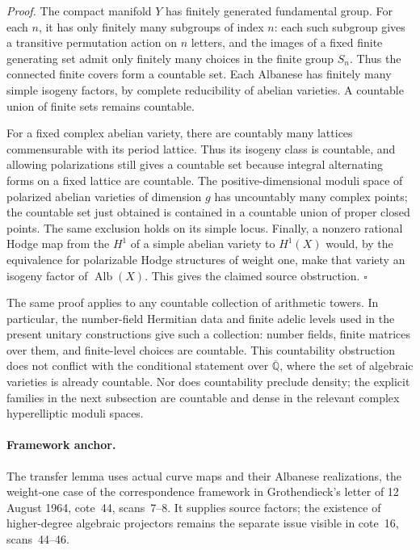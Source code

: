 \documentclass[11pt]{article}
\newcommand{\Q}{\mathbb Q}\newcommand{\C}{\mathbb C}\newcommand{\Z}{\mathbb Z}\newcommand{\R}{\mathbb R}\newcommand{\A}{\mathbb A}\newcommand{\OO}{\mathcal O}
\theoremstyle{definition}\newtheorem{definition}[theorem]{Definition}\newtheorem{remark}[theorem]{Remark}
\begin{document}
\emph{Proof.}
The compact manifold $Y$ has finitely generated fundamental group.  For
each $n$, it has only finitely many subgroups of index $n$: each such
subgroup gives a transitive permutation action on $n$ letters, and the
images of a fixed finite generating set admit only finitely many choices
in the finite group $S_n$.  Thus the connected finite covers form a
countable set.  Each Albanese has finitely many simple isogeny factors,
by complete reducibility of abelian varieties.  A countable union of
finite sets remains countable.

For a fixed complex abelian variety, there are countably many lattices
commensurable with its period lattice.  Thus its isogeny class is
countable, and allowing polarizations still gives a countable set because
integral alternating forms on a fixed lattice are countable.  The
positive-dimensional moduli space of polarized abelian varieties of
dimension $g$ has uncountably many complex points; the countable set just
obtained is contained in a countable union of proper closed points.
The same exclusion holds on its simple locus.  Finally, a nonzero rational
Hodge map from the $H^1$ of a simple abelian variety to $H^1(X)$ would,
by the equivalence for polarizable Hodge structures of weight one, make
that variety an isogeny factor of $\operatorname{Alb}(X)$.  This gives the
claimed source obstruction. \hfill$\square$

The same proof applies to any countable collection of arithmetic towers.
In particular, the number-field Hermitian data and finite adelic levels
used in the present unitary constructions give such a collection: number
fields, finite matrices over them, and finite-level choices are countable.
This countability obstruction does not conflict with the conditional
statement over $\overline{\Q}$, where the set of algebraic varieties is
already countable.  Nor does countability preclude density; the explicit
families in the next subsection are countable and dense in the relevant
complex hyperelliptic moduli spaces.

\paragraph{Framework anchor.}
The transfer lemma uses actual curve maps and their Albanese realizations,
the weight-one case of the correspondence framework in Grothendieck's
letter of 12 August 1964, cote~44, scans~7--8.  It supplies source factors;
the existence of higher-degree algebraic projectors remains the separate
issue visible in cote~16, scans~44--46.
\end{document}
